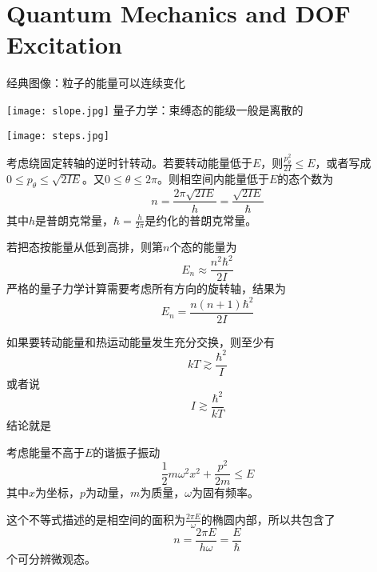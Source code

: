 \documentclass[CJK]{beamer}
\begin{document}
\section{Quantum Mechanics and DOF Excitation}


\begin{frame}
\bch
{}
经典图像：粒子的能量可以连续变化 

\texttt{[image: slope.jpg]}
\emini
\hspace{0.2in}
量子力学：束缚态的能级一般是离散的

 \texttt{[image: steps.jpg]}  
\emini
\ech
\end{frame}





\begin{frame}
\bch
{\large
考虑绕固定转轴的逆时针转动。若要转动能量低于$E$，则$\frac{p_\theta^2}{2I} \le E$，或者写成$0\le p_\theta \le \sqrt{2I E}$。又$0\le \theta \le 2\pi$。则相空间内能量低于$E$的态个数为
$$n = \frac{2\pi \sqrt{2IE}}{h} = \frac{\sqrt{2IE}}{\hbar}$$
其中{\blue $h$是普朗克常量，$\hbar = \frac{h}{2\pi}$是约化的普朗克常量}。

若把态按能量从低到高排，则第$n$个态的能量为
$$E_n \approx \frac{n^2\hbar^2}{2I}$$
严格的量子力学计算需要考虑所有方向的旋转轴，结果为
$$E_n = \frac{n(n+1)\hbar^2}{2I}$$}
\ech
\end{frame}


\begin{frame}
\bch
    {\large
      如果要转动能量和热运动能量发生充分交换，则至少有
$$kT \gtrsim \frac{\hbar^2}{I}$$
或者说
$$I \gtrsim \frac{\hbar^2}{kT}$$
结论就是
}
\ech
\end{frame}


\begin{frame}
\bch
{\large
{}
考虑能量不高于$E$的谐振子振动
$$  \frac{1}{2} m\omega^2 x^2 + \frac{p^2}{2m} \le E$$
其中$x$为坐标，$p$为动量，$m$为质量，$\omega $为固有频率。

这个不等式描述的是相空间的面积为$\frac{2\pi E}{\omega}$的椭圆内部，所以共包含了
$$n = \frac{2\pi E}{ h \omega} = \frac{E}{\hbar}$$
个可分辨微观态。}

\ech
\end{frame}
\end{document}
